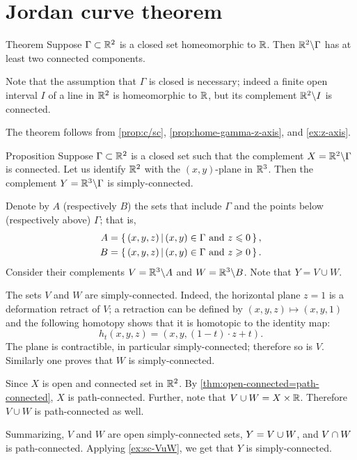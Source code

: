 \chapter{Jordan curve theorem}

\begin{thm}{Theorem}\label{thm:proper-jordan}
Suppose $\Gamma\subset\mathbb{R}^2$ is a closed set homeomorphic to $\mathbb{R}$.
Then $\mathbb{R}^2\backslash \Gamma$ has at least two connected components.
\end{thm}

Note that the assumption that $\Gamma$ is closed is necessary;
indeed a finite open interval $I$ of a line in $\mathbb{R}^2$ is homeomorphic to $\mathbb{R}$, but its complement $\mathbb{R}^2\backslash I$ is connected.

The theorem follows from \ref{prop:c/sc}, \ref{prop:home-gamma-z-axis}, and \ref{ex:z-axis}.

\begin{thm}{Proposition}\label{prop:c/sc}
Suppose $\Gamma\subset\mathbb{R}^2$ is a closed set such that the complement $X=\mathbb{R}^2\backslash \Gamma$ is connected.
Let us identify $\mathbb{R}^2$ with the $(x,y)$-plane in $\mathbb{R}^3$.
Then the complement $Y=\mathbb{R}^3\backslash \Gamma$ is simply-connected.
\end{thm}


Denote by $A$ (respectively $B$) the sets that include $\Gamma$ and the points below (respectively above) $\Gamma$;
that is,
\begin{align*}
A&=\left\{\,{(x,y,z)}\,\middle|\,{(x,y)\in\Gamma\ \text{and}\ z\leqslant 0}\,\right\},
\\
B&=\left\{\,{(x,y,z)}\,\middle|\,{(x,y)\in\Gamma\ \text{and}\ z\geqslant 0}\,\right\}.
\end{align*}
Consider their complements $V=\mathbb{R}^3\backslash A$ and $W=\mathbb{R}^3\backslash B$.
Note that $Y=V\cup W$.

The sets $V$ and $W$ are simply-connected.
Indeed, the horizontal plane $z= 1$ is a deformation retract of $V$;
a retraction can be defined by $(x,y,z)\mapsto (x,y,1)$ and the following homotopy shows that it is homotopic to the identity map: 
\[h_t(x,y,z)=(x,y,(1-t)\cdot z+t).\]
The plane is contractible, in particular simply-connected; therefore so is $V$.
Similarly one proves that $W$ is simply-connected.


Since $X$ is open and connected set in $\mathbb{R}^2$.
By \ref{thm:open-connected=path-connected}, $X$ is path-connected.
Further, note that $V\cup W=X\times \mathbb{R}$.
Therefore $V\cup W$ is path-connected as well.

Summarizing, $V$ and $W$ are open simply-connected sets, $Y=V\z\cup W$, and $V\z\cap W$ is path-connected.
Applying \ref{ex:sc-VuW}, we get that $Y$ is simply-connected.
\qeds

